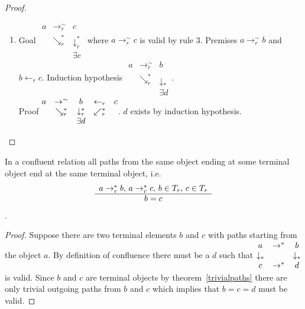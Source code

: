 \begin{theorem}
\begin{proof}
\begin{enumerate}
    \item
      Goal
      $\begin{matrix}
        a    & \to_r^\sim      & c                      \\
              & \searrow_r^* & \downarrow_r^*  \\
        & & \exists e
      \end{matrix}$
      where $a \to_r^\sim c$ is valid by rule 3. Premises $a \to_r^\sim b$
      and $b \gets_r c$.
      Induction hypothesis
      $\begin{matrix}
        a    & \to_r^\sim      & b                      \\
              & \searrow_r^* & \downarrow_*  \\
        & & \exists d
      \end{matrix}$.\\
      Proof
      $\begin{matrix}
        a              & \to^\sim       & b            & \gets_r & c \\
        & \searrow_r^* & \downarrow_r^* & \swarrow_r^* \\
        &              & \exists d
      \end{matrix}$.
      $d$ exists by induction hypothesis.
    \end{enumerate}
  \end{proof}
\end{theorem}


\begin{theorem}
  In a confluent relation all paths from the same object ending at some terminal
  object end at the same terminal object, i.e.
  $$\begin{array}{c} a \to_r^* b, \, a \to_r^* c, \, b \in T_r, \, c \in T_r \\ \hline b = c\end{array}$$.

  \begin{proof}
    Suppose there are two terminal elements $b$ and $c$ with paths starting
    from the object $a$.
    By definition of confluence there must be a $d$ such that
    $\begin{matrix} a & \to^* & b \\
      \downarrow_* & & \downarrow_* \\
      c & \to^* & d
    \end{matrix}$ is valid. Since $b$ and $c$ are terminal objects by
    theorem~\ref{trivialpaths} there are only trivial outgoing paths from $b$
    and $c$ which implies that $b = c = d$ must be valid.
  \end{proof}
\end{theorem}


